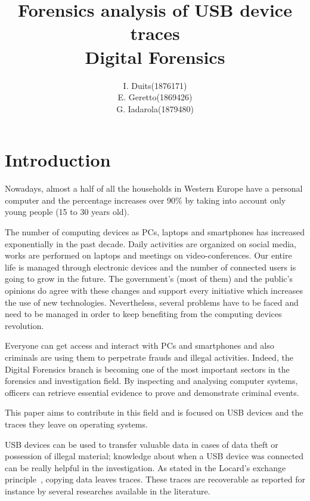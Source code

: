 \documentclass[a4paper]{article}
\title{Forensics analysis of USB device traces\\
\large Digital Forensics}
\author{
\begin{tabular}{>{\raggedleft}m{5cm}m{5cm}}
I. Duits & (1876171) \\
E. Geretto & (1869426) \\
G. Iadarola & (1879480) \\
\end{tabular}
}
\begin{document}
\maketitle


\section{Introduction}
Nowadays, almost a half of all the households in Western Europe have a personal
computer and the percentage increases over 90\% by taking into account only
young people (15 to 30 years old).

The number of computing devices as PCs, laptops and smartphones has increased
exponentially in the past decade. Daily activities are organized on social
media, works are performed on laptops and meetings on video-conferences. Our
entire life is managed through electronic devices and the number of connected
users is going to grow in the future. The government's (most of them) and the
public's opinions do agree with these changes and support every initiative
which increases the use of new technologies. Nevertheless, several problems have
to be faced and need to be managed in order to keep benefiting from the
computing devices revolution.

Everyone can get access and interact with PCs and smartphones and also criminals
are using them to perpetrate frauds and illegal activities. Indeed, the Digital
Forensics branch is becoming one of the most important sectors in the forensics
and investigation field. By inspecting and analysing computer systems, officers
can retrieve essential evidence to prove and demonstrate criminal events.

This paper aims to contribute in this field and is focused on USB devices and
the traces they leave on operating systems.

USB devices can be used to transfer valuable data in cases of data theft or
possession of illegal material; knowledge about when a USB device was connected
can be really helpful in the investigation. As stated in the Locard's exchange
principle~\cite{locard2008locard}, copying data leaves traces. These traces are
recoverable as reported for instance by several researches available in the
literature.~\cite{Tanushree12,Abhijeet14}
\end{document}
